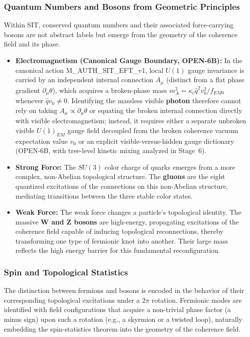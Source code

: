 \documentclass[american,11pt,letterpaper]{article}
\def\mathrm#1{#1}%
\def\texttt#1{#1}%
\def\emph#1{#1}%
\begin{document}
\subsubsection{Quantum Numbers and Bosons from Geometric Principles}

Within SIT, conserved quantum numbers and their associated force-carrying bosons are not abstract labels but emerge from the geometry of the coherence field and its phase.

\begin{itemize}
    \item \textbf{Electromagnetism (Canonical Gauge Boundary, \texttt{OPEN-6B}):} In the canonical action \texttt{M\_AUTH\_SIT\_EFT\_v1}, local $U(1)$ gauge invariance is carried by an \emph{independent} internal connection $A_\mu$ (distinct from a flat phase gradient $\partial_\mu\theta$), which acquires a broken-phase mass $m_A^2 = \kappa_c \hat{q}^2 v_0^2 / f_{\mathrm{EM}0}$ whenever $\hat{q}v_0 \ne 0$. Identifying the massless visible \textbf{photon} therefore cannot rely on taking $A_\mu \propto \partial_\mu\theta$ or equating the broken internal connection directly with visible electromagnetism; instead, it requires either a separate unbroken visible $U(1)_{\mathrm{EM}}$ gauge field decoupled from the broken coherence vacuum expectation value $v_0$ or an explicit visible-versus-hidden gauge dictionary (\texttt{OPEN-6B}, with tree-level kinetic mixing analyzed in Stage~6).

    \item \textbf{Strong Force:} The $SU(3)$ color charge of quarks emerges from a more complex, non-Abelian topological structure. The \textbf{gluons} are the eight quantized excitations of the connections on this non-Abelian structure, mediating transitions between the three stable color states.

    \item \textbf{Weak Force:} The weak force changes a particle's topological identity. The massive \textbf{W and Z bosons} are high-energy, propagating excitations of the coherence field capable of inducing topological reconnections, thereby transforming one type of fermionic knot into another. Their large mass reflects the high energy barrier for this fundamental reconfiguration.
\end{itemize}

\subsubsection{Spin and Topological Statistics}
The distinction between fermions and bosons is encoded in the behavior of their corresponding topological excitations under a $2\pi$ rotation. Fermionic modes are identified with field configurations that acquire a non-trivial phase factor (a minus sign) upon such a rotation (e.g., a skyrmion or a twisted loop), naturally embedding the spin-statistics theorem into the geometry of the coherence field.
\end{document}
